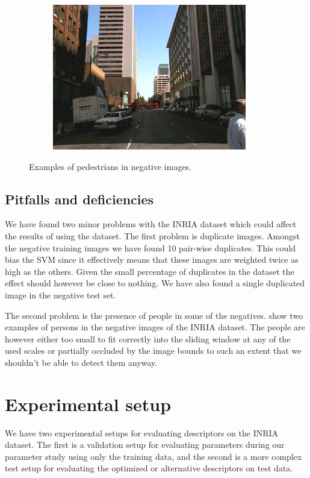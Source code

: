 \documentclass[thesis.tex]{subfiles}
\begin{document}
\begin{figure}[p]
{\begin{subfigure}[t]{0.593\textwidth}
	\end{subfigure}
	\begin{subfigure}[t]{0.593\textwidth}
		\includegraphics[width=\textwidth]{img/inriaManOccluded.png}
	\end{subfigure}
	}
	\caption{Examples of pedestrians in negative images.}
	\label{fig:inriaNegativePersons}
\end{figure}

\subsection{Pitfalls and deficiencies}
We have found two minor problems with the INRIA dataset which could affect the results of using the dataset. The first problem is duplicate images. Amongst the negative training images we have found 10 pair-wise duplicates. This could bias the SVM since it effectively means that these images are weighted twice as high as the others. Given the small percentage of duplicates in the dataset the effect should however be close to nothing. We have also found a single duplicated image in the negative test set.

The second problem is the presence of people in some of the negatives.
 show two examples of persons in the negative images of the INRIA dataset. The people are however either too small to fit correctly into the sliding window at any of the used scales or partially occluded by the image bounds to such an extent that we shouldn't be able to detect them anyway.

\section{Experimental setup}
\label{sec:inriaExperimentalSetup}
%
We have two experimental setups for evaluating descriptors on the INRIA dataset. The first is a validation setup for evaluating parameters during our parameter study using only the training data, and the second is a more complex test setup for evaluating the optimized or alternative descriptors on test data.
\end{document}
